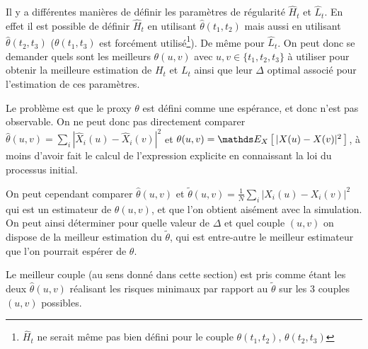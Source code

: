 \newcommand{\thetaA}{\Theta_{1 \rightarrow \overset{3}{\underset {2}{}}}}
\newcommand{\cindexA}{_{1 \rightarrow \overset{3}{\underset {2}{}}}}
\newcommand{\thetaB}{\Theta_{\overset 1{\underset{2}{ }} \rightarrow3}}
\newcommand{\cindexB}{_{\overset 1{\underset{2}{ }} \rightarrow3}}
\newcommand{\thetaC}{\Theta_{1 \rightarrow 2 \rightarrow 3}}
\newcommand{\cindexC}{_{1 \rightarrow 2 \rightarrow 3}}
\newcommand{\notequiv}{\overset {\textsf{\faTimes}} \iff}
\newcommand{\yesequiv}{\overset {\textsf{\faCheck}} \iff}

Il y a différentes manières de définir les paramètres de régularité $\hat H_t$ et $\hat L_t$. En effet il est possible de définir $\hat H_t$ en utilisant $\hat \theta (t_1, t_2)$ mais aussi en utilisant $\hat \theta (t_2, t_3)$ ($\theta(t_1, t_3)$ est forcément utilisé\footnote{$\hat H_t$ ne serait même pas bien défini pour le couple $\theta(t_1, t_2)$, $\theta(t_2, t_3)$}). De même pour $\hat L_t$. On peut donc se demander quels sont les meilleurs $\theta(u,v)$ avec $u,v \in \{t_1, t_2, t_3\}$ à utiliser pour obtenir la meilleure estimation de $H_t$ et $L_t$ ainsi que leur $\Delta$ optimal associé pour l'estimation de ces paramètres.

Le problème est que le proxy $\theta$ est défini comme une espérance, et donc n'est pas observable. On ne peut donc pas directement comparer $\hat \theta(u,v) = \sum_i|\widehat X_i(u) - \widehat X_i(v)|^2$ et $\theta(u,v) = \esperanceloi X { |X(u) - X(v)|^2 }$, à moins d'avoir fait le calcul de l'expression explicite en connaissant la loi du processus initial. 

On peut cependant comparer $\hat \theta(u,v)$ et $\widetilde \theta(u,v) = \frac 1 N \sum_i |X_i(u) - X_i(v)|^2$ qui est un estimateur de $\theta(u,v)$, et que l'on obtient aisément avec la simulation. On peut ainsi déterminer pour quelle valeur de $\Delta$ et quel couple $(u,v)$ on dispose de la meilleur estimation du $\tilde \theta$, qui est entre-autre le meilleur estimateur que l'on pourrait espérer de $\theta$.


Le meilleur couple (au sens donné dans cette section) est pris comme étant les deux $\hat \theta(u,v)$ réalisant les risques minimaux par rapport au $\tilde \theta$ sur les 3 couples $(u,v)$ possibles. 

